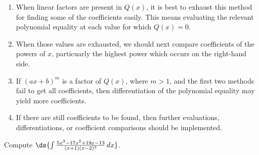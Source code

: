 \begin{enumerate}
\item When linear factors are present in $Q(x)$, it is best
      to exhaust this method for finding some of the coefficients
      easily. This means evaluating the relevant polynomial equality
      at each value for which $Q(x)=0$.
\item When those values are exhausted, we should next 
      compare coefficients of the
      powers of $x$, particuarly the highest power which occurs
      on the right-hand side.
\item If $(ax+b)^m$ is a factor of $Q(x)$, where $m>1$, 
      and the first two methods fail to get all coefficients,
      then differentiation of the polynomial equality may
      yield more coefficients.
\item If there are still coefficients to be found, then further
      evaluations, differentiations, or coefficient comparisons
      should be implemented.
\end{enumerate}
\bex Compute $\ds{\int\frac{5x^3-17x^2+19x-13}{(x+1)(x-2)^3}\,dx}$.

